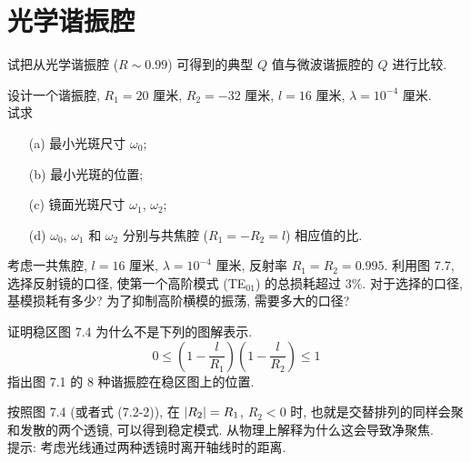 \documentclass{note}
\begin{document}
\setcounter{chapter}{7}
\fi
\chapter{光学谐振腔}
\begin{exe}
    试把从光学谐振腔 ($R\sim 0.99$) 可得到的典型 $Q$ 值与微波谐振腔的 $Q$ 进行比较.
\end{exe}
\begin{pf}

\end{pf}

\begin{exe}
    设计一个谐振腔, $R_1=20$ 厘米, $R_2=-32$ 厘米, $l=16$ 厘米, $\lambda=10^{-4}$ 厘米.\\
    试求
    \begin{itemize}
        \item[(a)] 最小光斑尺寸 $\omega_0$;
        \item[(b)] 最小光斑的位置;
        \item[(c)] 镜面光斑尺寸 $\omega_1$, $\omega_2$;
        \item[(d)] $\omega_0$, $\omega_1$ 和 $\omega_2$ 分别与共焦腔 ($R_1=-R_2=l$) 相应值的比.
    \end{itemize}
\end{exe}
\begin{sol}

\end{sol}

\begin{exe}
    考虑一共焦腔, $l=16$ 厘米, $\lambda=10^{-4}$ 厘米, 反射率 $R_1=R_2=0.995$. 利用图 7.7, 选择反射镜的口径, 使第一个高阶模式 (TE$_{01}$) 的总损耗超过 $3\%$. 对于选择的口径, 基模损耗有多少? 为了抑制高阶横模的振荡, 需要多大的口径?
\end{exe}
\begin{sol}
    
\end{sol}

\begin{exe}
    证明稳区图 7.4 为什么不是下列的图解表示.
    \[
        0\leq\left(1-\frac{l}{R_1}\right)\left(1-\frac{l}{R_2}\right)\leq 1
    \]
    指出图 7.1 的 8 种谐振腔在稳区图上的位置.
\end{exe}
\begin{sol}
    
\end{sol}

\begin{exe}
    按照图 7.4 (或者式 (7.2-2)), 在 $\left\lvert R_2\right\rvert=R_1$, $R_2<0$ 时, 也就是交替排列的同样会聚和发散的两个透镜, 可以得到稳定模式. 从物理上解释为什么这会导致净聚焦.\\
    提示: 考虑光线通过两种透镜时离开轴线时的距离.
\end{exe}
\begin{sol}
    
\end{sol}
\end{document}
